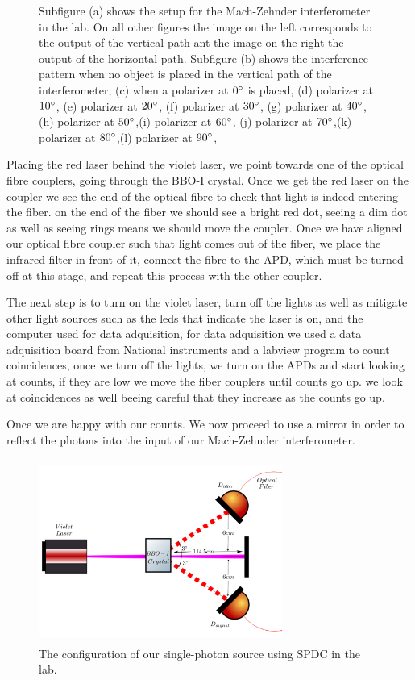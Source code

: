 \documentclass[12pt]{book}
\begin{document}
\begin{figure}[t!]
\caption{ Subfigure (a) shows the setup for the Mach-Zehnder interferometer in the lab. On all other figures the image on the left corresponds to the output of the vertical path ant the image on the right the output of the horizontal path. Subfigure (b) shows the interference pattern when no object is placed in the vertical path of the interferometer, (c) when a polarizer at $0\degree$ is placed, (d) polarizer at $10\degree$, (e) polarizer at $20\degree$, (f) polarizer at $30\degree$, (g) polarizer at $40\degree$, (h) polarizer at $50\degree$,(i) polarizer at $60\degree$, (j) polarizer at $70\degree$,(k) polarizer at $80\degree$,(l) polarizer at $90\degree$,}
\label{intensities2222}
\end{figure}





Placing the red laser behind the violet laser, we point towards one of the optical fibre couplers, going through the BBO-I crystal. Once we get the red laser on the coupler we see the end of the optical fibre to check that light is indeed entering the fiber. on the end of the fiber we should see a bright red dot, seeing a dim dot as well as seeing rings means we should move the coupler. Once we have aligned our optical fibre coupler such that light comes out of the fiber, we place the infrared filter in front of it, connect the fibre to the APD, which must be turned off at this stage, and repeat this process with the other coupler.

The next step is to turn on the violet laser, turn off the lights as well as mitigate other light sources such as the leds that indicate the laser is on, and the computer used for data adquisition, for data adquisition we used a data adquisition board from National instruments and a labview program to count coincidences, once we turn off the lights, we turn on the APDs and start looking at counts, if they are low we move the fiber couplers until counts go up. we look at coincidences as well beeing careful that they increase as the counts go up.

Once we are happy with our counts. We now proceed to use a mirror in order to reflect the photons into the input of our Mach-Zehnder interferometer.

\begin{figure}[t!]
\center
\includegraphics[width=8cm,height=6cm]{images/sPDC.png}
\caption{The configuration of our single-photon source using SPDC in the lab.}
\end{figure} 
\end{document}
